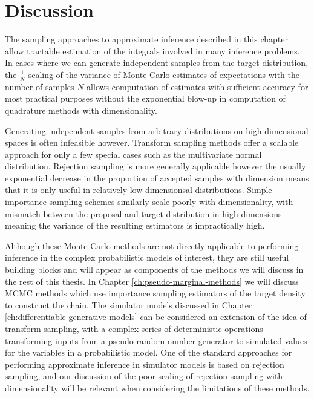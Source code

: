 \section{Discussion}

The sampling approaches to approximate inference described in this chapter allow tractable estimation of the integrals involved in many inference problems. In cases where we can generate independent samples from the target distribution, the $\frac{1}{N}$ scaling of the variance of Monte Carlo estimates of expectations with the number of samples $N$ allows computation of estimates with sufficient accuracy for most practical purposes without the exponential blow-up in computation of quadrature methods with dimensionality. %

Generating independent samples from arbitrary distributions on high-dimensional spaces is often infeasible however. Transform sampling methods offer a scalable approach for only a few special cases such as the multivariate normal distribution. Rejection sampling is more generally applicable however the usually exponential decrease in the proportion of accepted samples with dimension means that it is only useful in relatively low-dimensionsal distributions. Simple importance sampling schemes similarly scale poorly with dimensionality, with mismatch bet\-ween the proposal and target distribution in high-dimensions meaning the variance of the resulting estimators is impractically high.

Although these Monte Carlo methods are not directly applicable to performing inference in the complex probabilistic models of interest, they are still useful building blocks and will appear as components of the methods we will discuss in the rest of this thesis. In Chapter \ref{ch:pseudo-marginal-methods} we will discuss \ac{MCMC} methods which use importance sampling estimators of the target density to construct the chain. The simulator models discussed in Chapter \ref{ch:differentiable-generative-models} can be considered an extension of the idea of transform sampling, with a complex series of deterministic operations transforming inputs from a pseudo-random number generator to simulated values for the variables in a probabilistic model. One of the standard approaches for performing approximate inference in simulator models is based on rejection sampling, and our discussion of the poor scaling of rejection sampling with dimensionality will be relevant when considering the limitations of these methods.

